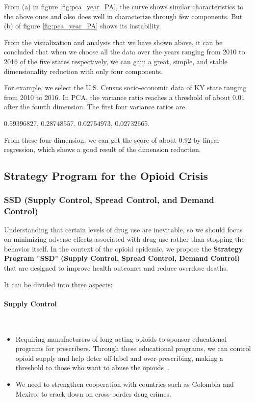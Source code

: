 \documentclass{mcmthesis}
\begin{document}
From (a) in figure \ref{fig:pca_year_PA}, the curve shows similar characteristics to the above ones and also does well in characterize through few components. But (b) of figure \ref{fig:pca_year_PA} shows its instability.

From the visualization and analysis that we have shown above, it can be concluded that when we choose all the data over the years ranging from 2010 to 2016 of the five states respectively, we can gain a great, simple, and stable dimensionality reduction with only four components.

For example, we select the U.S. Census socio-economic data of KY state ranging from 2010 to 2016. In PCA, the variance ratio reaches a threshold of about $0.01$ after the fourth dimension. The first four variance ratios are 
\begin{center}
    $0.59396827$, $0.28748557$, $0.02754973$, $0.02732665$.
\end{center}

From these four dimension, we can get the score of about $0.92$ by linear regression, which shows a good result of the dimension reduction. 

\subsection{Strategy Program for the Opioid Crisis}\label{Sec:Strategy}

\subsubsection{SSD (Supply Control, Spread Control, and Demand Control) }
	
	Understanding that certain levels of drug use are inevitable, so we should focus on minimizing adverse effects associated with drug use rather than stopping the behavior itself. In the context of the opioid epidemic, we propose the \textbf{Strategy Program "SSD" (Supply Control, Spread Control, Demand Control)} that are designed to improve health outcomes and reduce overdose deaths.
	
    It can be divided into three aspects:
\paragraph{\textbf{Supply Control}}

~\smallskip

\begin{itemize}
    \item Requiring manufacturers of long-acting opioids to sponsor educational programs for prescribers. Through these educational programs, we can control opioid supply and help deter off-label and over-prescribing, making a threshold to those who want to abuse the opioids~\cite{FUSTER2018487}.
    \item We need to strengthen cooperation with countries such as Colombia and Mexico, to crack down on cross-border drug crimes.
\end{itemize}
\end{document}
